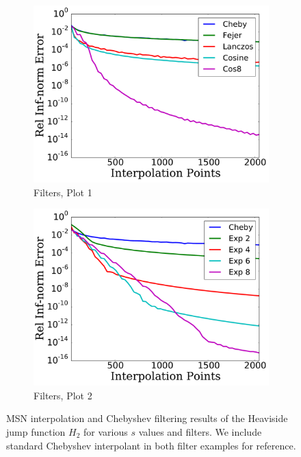 \begin{figure}[p]
    \begin{subfigure}{0.45\textwidth}
    \includegraphics[width=\textwidth]{plots/cheby_interp_filter_rough_heaviside_2.pdf}
    \caption{Filters, Plot 1}
    \end{subfigure}
    \begin{subfigure}{0.45\textwidth}
    \includegraphics[width=\textwidth]{plots/cheby_interp_filter_2_rough_heaviside_2.pdf}
    \caption{Filters, Plot 2}
    \end{subfigure}
\caption[Rough Interpolation Comparison: Heaviside Jump Function 2]{
MSN interpolation and Chebyshev filtering results of the Heaviside jump
function $H_{2}$ for various $s$ values and filters.
We include standard Chebyshev interpolant in both filter examples for reference.
}
\label{fig:rough_comparison_heaviside_2}
\end{figure}



